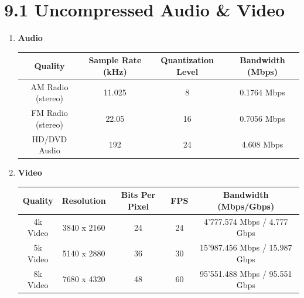\documentclass{article}
\begin{document}
	\pagestyle{fancy}
	
	\section*{9.1 Uncompressed Audio \& Video}
	\begin{adjustwidth}{2em}{2em}
		\begin{enumerate}
			\item \textbf{Audio}
			\begin{adjustwidth}{-2em}{}
			\begin{tabular}{|c|c|c|c|}
				\hline
				\textbf{Quality} & \textbf{Sample Rate (kHz)} & \textbf{Quantization Level} & \textbf{Bandwidth (Mbps)} \\
				\hline
				AM Radio (stereo) & 11.025 & 8 & 0.1764 Mbps \\
				FM Radio (stereo) & 22.05 & 16 & 0.7056 Mbps \\
				HD/DVD Audio & 192 & 24 & 4.608 Mbps \\
				\hline
			\end{tabular}
			\end{adjustwidth}
			\item \textbf{Video} \\
			\begin{tabular}{|c|c|c|c|c|}
				\hline
				\textbf{Quality} & \textbf{Resolution} & \textbf{Bits Per Pixel} & \textbf{FPS} & \textbf{Bandwidth (Mbps/Gbps)} \\
				\hline
				4k Video & 3840 x 2160 & 24 & 24 & 4'777.574 Mbps / 4.777 Gbps \\
				5k Video & 5140 x 2880 & 36 & 30 & 15'987.456 Mbps / 15.987 Gbps \\
				8k Video & 7680 x 4320 & 48 & 60 & 95'551.488 Mbps / 95.551 Gbps \\
				\hline
			\end{tabular}
		\end{enumerate}
	\end{adjustwidth}
	
\end{document}
